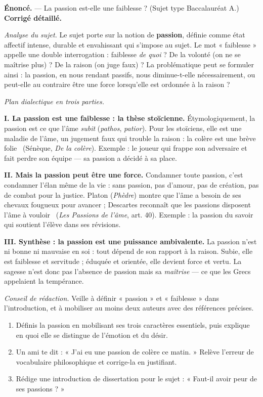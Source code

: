 \documentclass[11pt]{article}
\begin{document}
\begin{exoresolu}
\textbf{Énoncé.} — La passion est-elle une faiblesse ? (Sujet type Baccalauréat A.)
\tcblower
\textbf{Corrigé détaillé.}

\emph{Analyse du sujet.} Le sujet porte sur la notion de \textbf{passion}, définie comme état affectif intense, durable et envahissant qui s'impose au sujet. Le mot « faiblesse » appelle une double interrogation : faiblesse \emph{de quoi} ? De la volonté (on ne se maîtrise plus) ? De la raison (on juge faux) ? La problématique peut se formuler ainsi : la passion, en nous rendant passifs, nous diminue-t-elle nécessairement, ou peut-elle au contraire être une force lorsqu'elle est ordonnée à la raison ?

\emph{Plan dialectique en trois parties.}

\textbf{I. La passion est une faiblesse : la thèse stoïcienne.} Étymologiquement, la passion est ce que l'âme \emph{subit} (\emph{pathos}, \emph{patior}). Pour les stoïciens, elle est une maladie de l'âme, un jugement faux qui trouble la raison : la colère est une \guillemotleft brève folie \guillemotright\ (Sénèque, \emph{De la colère}). Exemple : le joueur qui frappe son adversaire et fait perdre son équipe — sa passion a décidé à sa place.

\textbf{II. Mais la passion peut être une force.} Condamner toute passion, c'est condamner l'élan même de la vie : sans passion, pas d'amour, pas de création, pas de combat pour la justice. Platon (\emph{Phèdre}) montre que l'âme a besoin de ses chevaux fougueux pour avancer ; Descartes reconnaît que les passions \guillemotleft disposent l'âme à vouloir \guillemotright\ (\emph{Les Passions de l'âme}, art. 40). Exemple : la passion du savoir qui soutient l'élève dans ses révisions.

\textbf{III. Synthèse : la passion est une puissance ambivalente.} La passion n'est ni bonne ni mauvaise en soi : tout dépend de son rapport à la raison. Subie, elle est faiblesse et servitude ; éduquée et orientée, elle devient force et vertu. La sagesse n'est donc pas l'absence de passion mais sa \emph{maîtrise} — ce que les Grecs appelaient la tempérance.

\emph{Conseil de rédaction.} Veille à définir « passion » et « faiblesse » dans l'introduction, et à mobiliser au moins deux auteurs avec des références précises.
\end{exoresolu}

\begin{exercice}
\begin{enumerate}
\item Définis la passion en mobilisant ses trois caractères essentiels, puis explique en quoi elle se distingue de l'émotion et du désir.
\item Un ami te dit : « J'ai eu une passion de colère ce matin. » Relève l'erreur de vocabulaire philosophique et corrige-la en justifiant.
\item Rédige une introduction de dissertation pour le sujet : « Faut-il avoir peur de ses passions ? »
\end{enumerate}
\end{exercice}
\end{document}

